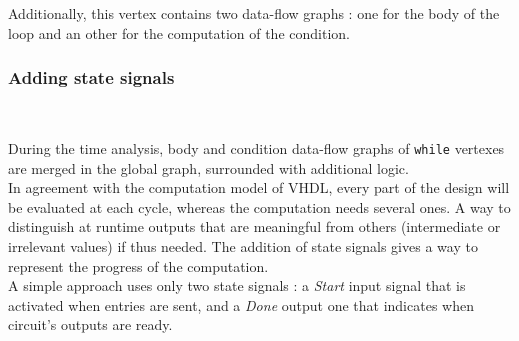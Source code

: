 \documentclass[10pt,a4paper]{article}
\newcommand{\code}{\texttt}
\renewcommand{\indent}{~\\\vspace{-.8cm}}
\begin{document}
Additionally, this vertex contains two data-flow graphs : one for the body of the loop and an other for the computation of the condition.\\


\subsubsection{Adding state signals} \indent

During the time analysis, body and condition data-flow graphs of \code {while} vertexes are merged in the global graph, surrounded with additional logic.\\


In agreement with the computation model of VHDL, every part of the design will be evaluated at each cycle, whereas the computation needs several ones. A way to distinguish at runtime outputs that are meaningful from others (intermediate or irrelevant values) if thus needed. The addition of state signals gives a way to represent the progress of the computation.\\


A simple approach uses only two state signals : a \textit{Start} input signal that is activated when entries are sent, and a \textit{Done} output one that indicates when circuit's outputs are ready.
\end{document}

